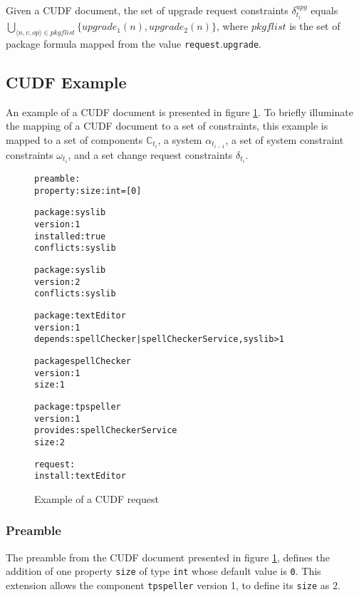 \begin{defs}
Given a CUDF document, the set of upgrade request constraints $\delta_{t_i}^{upg}$ equals $\bigcup \limits_{\langle n,v,op \rangle \in pkgflist} \{upgrade_1(n),upgrade_2(n)\}$, 
where $pkgflist$ is the set of package formula mapped from the value \texttt{request}.\texttt{upgrade}.
\end{defs}


\subsection{CUDF Example}
\label{formal.example}
An example of a CUDF document is presented in figure \ref{formal.CUDFEXAMPLE}.
To briefly illuminate the mapping of a CUDF document to a set of constraints, 
this example is mapped to a set of components $\mathbb{C}_{t_i}$, a system $\alpha_{t_{i-1}}$, 
a set of system constraint constraints $\omega_{t_i}$, 
and a set change request constraints $\delta_{t_i}$.

\begin{figure}[htp] 
\begin{center}
\begin{alltt}
preamble:
property: size: int = [0]

package: syslib
version: 1
installed: true
conflicts: syslib

package: syslib
version: 2
conflicts: syslib

package: textEditor
version: 1
depends: spellChecker | spellCheckerService, syslib > 1

package spellChecker
version: 1
size: 1

package: tpspeller
version: 1
provides: spellCheckerService
size: 2

request:
install:textEditor

\end{alltt}
  \caption[CUDF Example]{Example of a CUDF request}
  \label{formal.CUDFEXAMPLE}
\end{center}
\end{figure} 


\subsubsection{Preamble}
The preamble from the CUDF document presented in figure \ref{formal.CUDFEXAMPLE}, 
defines the addition of one property \verb+size+ of type \verb+int+ whose default value is \verb+0+.
This extension allows the component \verb+tpspeller+ version 1, to define its \verb+size+ as $2$.

